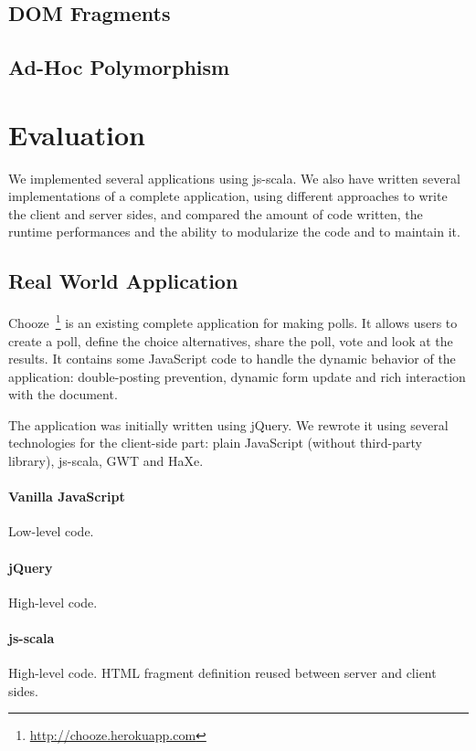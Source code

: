 \documentclass[preprint]{sigplanconf}
\begin{document}
\subsection{DOM Fragments}

\subsection{Ad-Hoc Polymorphism}

\section{Evaluation}
\label{validation}

We implemented several applications using js-scala. We also have written several implementations of a complete
application, using different approaches to write the client and server sides, and compared the amount of code
written, the runtime performances and the ability to modularize the code and to maintain it.

\subsection{Real World Application}

Chooze~\footnote{\href{http://chooze.herokuapp.com}{http://chooze.herokuapp.com}} is an existing complete
application for making polls. It allows users to create a poll, define the choice alternatives, share the poll, vote
and look at the results. It contains some JavaScript code to handle the dynamic behavior of the application:
double-posting prevention, dynamic form update and rich interaction with the document.

The application was initially written using jQuery. We rewrote it using several technologies for the client-side
part: plain JavaScript (without third-party library), js-scala, GWT and HaXe.

\paragraph*{Vanilla JavaScript} Low-level code.

\paragraph*{jQuery} High-level code.

\paragraph*{js-scala} High-level code. HTML fragment definition reused between server and client sides.
\end{document}

